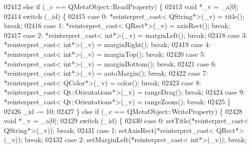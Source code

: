 \begin{DoxyCode}
02412       \textcolor{keywordflow}{else} \textcolor{keywordflow}{if} (\_c == QMetaObject::ReadProperty) \{
02413         \textcolor{keywordtype}{void} *\_v = \_a[0];
02414         \textcolor{keywordflow}{switch} (\_id) \{
02415         \textcolor{keywordflow}{case} 0: *\textcolor{keyword}{reinterpret\_cast<} QString*\textcolor{keyword}{>}(\_v) = title(); \textcolor{keywordflow}{break};
02416         \textcolor{keywordflow}{case} 1: *\textcolor{keyword}{reinterpret\_cast<} QRect*\textcolor{keyword}{>}(\_v) = axisRect(); \textcolor{keywordflow}{break};
02417         \textcolor{keywordflow}{case} 2: *\textcolor{keyword}{reinterpret\_cast<} \textcolor{keywordtype}{int}*\textcolor{keyword}{>}(\_v) = marginLeft(); \textcolor{keywordflow}{break};
02418         \textcolor{keywordflow}{case} 3: *\textcolor{keyword}{reinterpret\_cast<} \textcolor{keywordtype}{int}*\textcolor{keyword}{>}(\_v) = marginRight(); \textcolor{keywordflow}{break};
02419         \textcolor{keywordflow}{case} 4: *\textcolor{keyword}{reinterpret\_cast<} \textcolor{keywordtype}{int}*\textcolor{keyword}{>}(\_v) = marginTop(); \textcolor{keywordflow}{break};
02420         \textcolor{keywordflow}{case} 5: *\textcolor{keyword}{reinterpret\_cast<} \textcolor{keywordtype}{int}*\textcolor{keyword}{>}(\_v) = marginBottom(); \textcolor{keywordflow}{break};
02421         \textcolor{keywordflow}{case} 6: *\textcolor{keyword}{reinterpret\_cast<} \textcolor{keywordtype}{int}*\textcolor{keyword}{>}(\_v) = autoMargin(); \textcolor{keywordflow}{break};
02422         \textcolor{keywordflow}{case} 7: *\textcolor{keyword}{reinterpret\_cast<} QColor*\textcolor{keyword}{>}(\_v) = color(); \textcolor{keywordflow}{break};
02423         \textcolor{keywordflow}{case} 8: *\textcolor{keyword}{reinterpret\_cast<} Qt::Orientations*\textcolor{keyword}{>}(\_v) = rangeDrag(); \textcolor{keywordflow}{break};
02424         \textcolor{keywordflow}{case} 9: *\textcolor{keyword}{reinterpret\_cast<} Qt::Orientations*\textcolor{keyword}{>}(\_v) = rangeZoom(); \textcolor{keywordflow}{break};
02425         \}
02426         \_id -= 10;
02427     \} \textcolor{keywordflow}{else} \textcolor{keywordflow}{if} (\_c == QMetaObject::WriteProperty) \{
02428         \textcolor{keywordtype}{void} *\_v = \_a[0];
02429         \textcolor{keywordflow}{switch} (\_id) \{
02430         \textcolor{keywordflow}{case} 0: setTitle(*reinterpret\_cast< QString*>(\_v)); \textcolor{keywordflow}{break};
02431         \textcolor{keywordflow}{case} 1: setAxisRect(*reinterpret\_cast< QRect*>(\_v)); \textcolor{keywordflow}{break};
02432         \textcolor{keywordflow}{case} 2: setMarginLeft(*reinterpret\_cast< int*>(\_v)); \textcolor{keywordflow}{break};

\end{DoxyCode}
